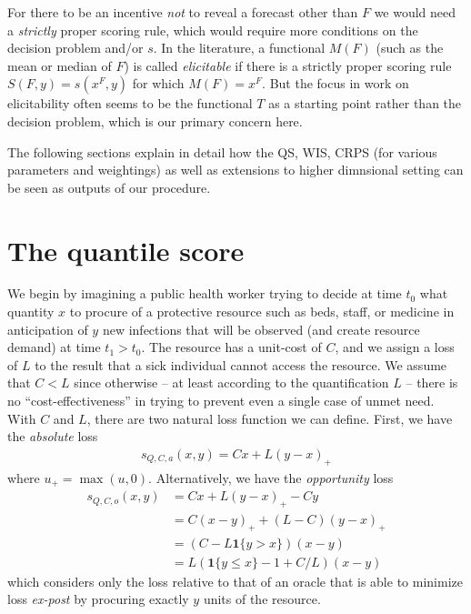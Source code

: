 \documentclass{article}
\begin{document}
\begin{remark} For there to be an incentive \emph{not} to reveal a forecast other than $F$ we would need a \emph{strictly} proper scoring rule, which would require more conditions on the decision problem and/or $s$. In the literature, a functional $M(F)$ (such as the mean or median of $F$) is called \emph{elicitable} if there is a strictly proper scoring rule $S(F,y) = s(x^F,y)$ for which $M(F)=x^F$.  But the focus in work on elicitability often seems to be the functional $T$ as a starting point rather than the decision problem, which is our primary concern here.
\end{remark}

The following sections explain in detail how the QS, WIS, CRPS (for various parameters and weightings) as well as extensions to higher dimnsional setting can be seen as outputs of our procedure. 

\section{The quantile score}

We begin by imagining a public health worker trying to decide at time $t_0$ what quantity $x$ to procure of a protective resource such as beds, staff, or medicine in anticipation of $y$ new infections that will be observed (and create resource demand) at time $t_1>t_0$. The resource has a unit-cost of $C$, and we assign a loss of $L$ to the result that a sick individual cannot access the resource. We assume that $C < L$ since otherwise -- at least according to the quantification $L$ -- there is no ``cost-effectiveness'' in trying to prevent even a single case of unmet need.  With $C$ and $L$, there are two natural loss function we can define.  First, we have the \emph{absolute} loss  
\begin{align}
s_{Q,C,a}(x,y) = Cx + L(y-x)_+ \label{eqn:quantile_loss}
\end{align}
where $u_+ = \max(u,0)$.  Alternatively, we have the \emph{opportunity} loss 
\begin{align}
s_{Q,C,o}(x,y) &= Cx + L(y-x)_+ - Cy \\
&= C(x-y)_+ + (L-C)(y-x)_+ \\
&= (C - L \mathbf{1}\{y > x\})(x-y) \\
&= L(\mathbf{1}\{y \leq x\} - 1 + C/L)(x - y)\label{eqn:quantile_loss_opp}
\end{align}
which considers only the loss relative to that of an oracle that is able to minimize loss \textit{ex-post} by procuring 
exactly $y$ units of the resource.
\end{document}
